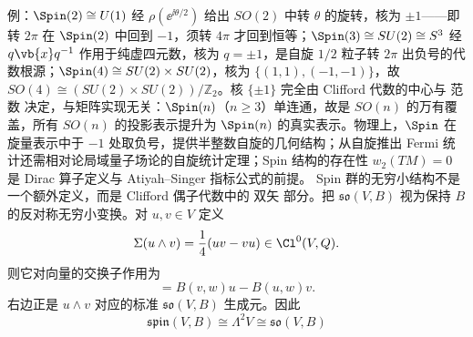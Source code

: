 例：$\Spin(2)\cong U(1)$ 经 $\rho(\ee^{\ii \theta/2})$ 给出 $SO(2)$ 中转 $\theta$ 的旋转，核为 $\pm1$——即转 $2\pi$ 在 $\Spin(2)$ 中回到 $-1$，须转 $4\pi$ 才回到恒等；$\Spin(3)\cong SU(2)\cong S^3$ 经 $q\vb{x}q^{-1}$ 作用于纯虚四元数，核为 $q=\pm1$，是自旋 $1/2$ 粒子转 $2\pi$ 出负号的代数根源；$\Spin(4)\cong SU(2)\times SU(2)$，核为 $\{(1,1),(-1,-1)\}$，故 $SO(4)\cong(SU(2)\times SU(2))/\mathbb Z_2$。核 $\{\pm1\}$ 完全由 Clifford 代数的中心与 范数 决定，与矩阵实现无关：$\Spin(n)$（$n\ge3$）单连通，故是 $SO(n)$ 的万有覆盖，所有 $SO(n)$ 的投影表示提升为 $\Spin(n)$ 的真实表示。物理上，$\Spin$ 在旋量表示中于 $-1$ 处取负号，提供半整数自旋的几何结构；从自旋推出 Fermi 统计还需相对论局域量子场论的自旋统计定理；Spin 结构的存在性 $w_2(TM)=0$ 是 Dirac 算子定义与 Atiyah--Singer 指标公式的前提。
Spin 群的无穷小结构不是一个额外定义，而是 Clifford 偶子代数中的 双矢 部分。把 $\mathfrak{so}(V,B)$ 视为保持 $B$ 的反对称无穷小变换。对 $u,v\in V$ 定义
\begin{equation*}\Sigma(u\wedge v)
=\frac14(uv-vu)\in\Cl^0(V,Q).\end{equation*}
则它对向量的交换子作用为
\begin{equation}
[\Sigma(u\wedge v),w]
=B(v,w)u-B(u,w)v.
\label{eq:spin-bivector-so-action}
\end{equation}
右边正是 $u\wedge v$ 对应的标准 $\mathfrak{so}(V,B)$ 生成元。因此
\begin{equation}
\mathfrak{spin}(V,B)
\cong\Lambda^2V
\cong\mathfrak{so}(V,B)
\label{eq:spin-lie-algebra-isomorphism}
\end{equation}

